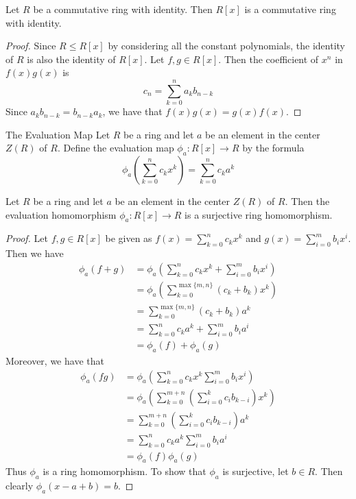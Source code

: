 \documentclass[a4paper]{article}
\begin{document}
\begin{prp}{}{} Let $R$ be a commutative ring with identity. Then $R[x]$ is a commutative ring with identity. 
\begin{proof}
Since $R\leq R[x]$ by considering all the constant polynomials, the identity of $R$ is also the identity of $R[x]$. Let $f,g\in R[x]$. Then the coefficient of $x^n$ in $f(x)g(x)$ is $$c_n=\sum_{k=0}^na_kb_{n-k}$$ Since $a_kb_{n-k}=b_{n-k}a_k$, we have that $f(x)g(x)=g(x)f(x)$. 
\end{proof}
\end{prp}

\begin{defn}{The Evaluation Map}{} Let $R$ be a ring and let $a$ be an element in the center $Z(R)$ of $R$. Define the evaluation map $\phi_a:R[x]\to R$ by the formula $$\phi_a\left(\sum_{k=0}^nc_kx^k\right)=\sum_{k=0}^nc_ka^k$$
\end{defn}

\begin{prp}{}{} Let $R$ be a ring and let $a$ be an element in the center $Z(R)$ of $R$. Then the evaluation homomorphism $\phi_a:R[x]\to R$ is a surjective ring homomorphism. 
\begin{proof}
Let $f,g\in R[x]$ be given as $f(x)=\sum_{k=0}^nc_kx^k$ and $g(x)=\sum_{i=0}^mb_ix^i$. Then we have 
\begin{align*}
\phi_a(f+g)&=\phi_a\left(\sum_{k=0}^nc_kx^k+\sum_{i=0}^mb_ix^i\right)\\
&=\phi_a\left(\sum_{k=0}^{\max\{m,n\}}(c_k+b_k)x^k\right)\\
&=\sum_{k=0}^{\max\{m,n\}}(c_k+b_k)a^k\\
&=\sum_{k=0}^nc_ka^k+\sum_{i=0}^mb_ia^i\\
&=\phi_a(f)+\phi_a(g)
\end{align*}
Moreover, we have that 
\begin{align*}
\phi_a(fg)&=\phi_a\left(\sum_{k=0}^nc_kx^k\sum_{i=0}^mb_ix^i\right)\\
&=\phi_a\left(\sum_{k=0}^{m+n}\left(\sum_{i=0}^kc_ib_{k-i}\right)x^k\right)\\
&=\sum_{k=0}^{m+n}\left(\sum_{i=0}^kc_ib_{k-i}\right)a^k\\
&=\sum_{k=0}^nc_ka^k\sum_{i=0}^mb_ia^i\tag{$a\in Z(R)$}\\
&=\phi_a(f)\phi_a(g)
\end{align*}
Thus $\phi_a$ is a ring homomorphism. To show that $\phi_a$ is surjective, let $b\in R$. Then clearly $\phi_a(x-a+b)=b$. 
\end{proof}
\end{prp}
\end{document}
